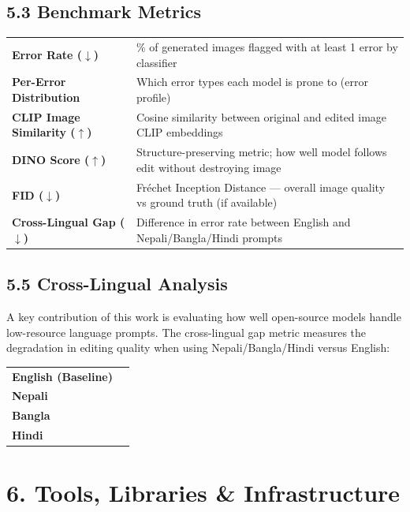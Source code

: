 \documentclass[11pt,a4paper]{article}
\begin{document}
\subsection{5.3 Benchmark Metrics}

\begin{tabularx}{\textwidth}{>{\bfseries}lX}
\toprule
Error Rate ($\downarrow$) & \% of generated images flagged with at least 1 error by classifier \\
\rowcolor{lightgray}
Per-Error Distribution & Which error types each model is prone to (error profile) \\
CLIP Image Similarity ($\uparrow$) & Cosine similarity between original and edited image CLIP embeddings \\
\rowcolor{lightgray}
DINO Score ($\uparrow$) & Structure-preserving metric; how well model follows edit without destroying image \\
FID ($\downarrow$) & Fr\'{e}chet Inception Distance — overall image quality vs ground truth (if available) \\
\rowcolor{lightgray}
Cross-Lingual Gap ($\downarrow$) & Difference in error rate between English and Nepali/Bangla/Hindi prompts \\
\bottomrule
\end{tabularx}

\subsection{5.5 Cross-Lingual Analysis}

A key contribution of this work is evaluating how well open-source models handle low-resource language prompts. The cross-lingual gap metric measures the degradation in editing quality when using Nepali/Bangla/Hindi versus English:

\vspace{6pt}
\begin{tabularx}{\textwidth}{>{\bfseries}lX}
\toprule
English (Baseline) & \\
\rowcolor{lightgray}
Nepali & \\
Bangla & \\
\rowcolor{lightgray}
Hindi & \\
\bottomrule
\end{tabularx}

\section{6. Tools, Libraries \& Infrastructure}
\end{document}

